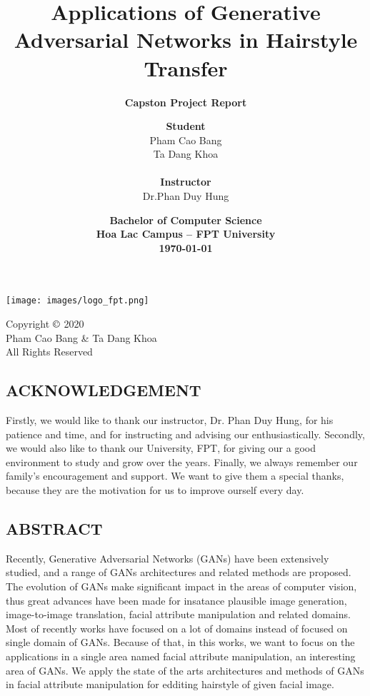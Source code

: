 \documentclass[12pt]{article}
\title {\textbf{\Huge Applications of Generative Adversarial Networks in Hairstyle Transfer \vspace*{2\baselineskip}}} %
\subtitle{\textbf{Capston Project Report}}
\author{
        \textbf{Student}\\Pham Cao Bang\\Ta Dang Khoa\\\\ \textbf{Instructor}\\Dr.Phan Duy Hung
 } %
\date{\vfill  \textbf{Bachelor of Computer Science\\
                     Hoa Lac Campus – FPT University \\ \today}
 } %
\begin{document}
    \maketitle %
    \begin{center}
        \texttt{[image: images/logo\_fpt.png]}\\
    \end{center}
    \vspace*{18\baselineskip}
    \begin{center}
     \Large Copyright $\copyright$ 2020 \\ 
            Pham Cao Bang \& Ta Dang Khoa \\ 
            All Rights Reserved
    \end{center}

    \newpage
    \begin{center}
        \section*{\Large ACKNOWLEDGEMENT}
    \end{center}
    \vspace*{2\baselineskip}
    
    Firstly, we would like to thank our instructor, Dr. Phan Duy Hung, for his patience and time, and for instructing and advising our enthusiastically. Secondly, we would also like to thank our University, FPT, for giving our a good environment to study and grow over the years. Finally, we always remember our family{\rq}s encouragement and support. We want to give them a special thanks, because they are the motivation for us to improve ourself every day.\\
    
    \newpage
    \begin{center}
        \section*{\Large ABSTRACT} %
    \end{center}
    \vspace*{2\baselineskip}  
	
	Recently, Generative Adversarial Networks (GANs) have been extensively studied, and a range of GANs architectures and related methods are proposed. The evolution of GANs make significant impact in the areas of computer vision, thus great advances have been made for insatance plausible image generation, image-to-image translation, facial attribute manipulation and related domains. Most of recently works have focused on a lot of domains instead of focused on single domain of GANs. Because of that, in this works, we want to focus on the applications in a single area named facial attribute manipulation, an interesting area of GANs. We apply the state of the arts architectures and methods of GANs in facial attribute manipulation for edditing hairstyle of given facial image.
	
\end{document}

